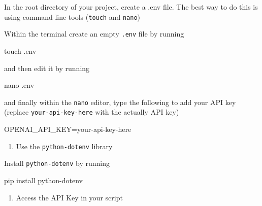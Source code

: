 \documentclass[
  letterpaper,
  DIV=11,
  numbers=noendperiod]{scrreprt}
\newenvironment{Shaded}{\begin{snugshade}}{\end{snugshade}}
\newcommand{\NormalTok}[1]{\textcolor[rgb]{0.00,0.23,0.31}{#1}}
\newcommand{\OperatorTok}[1]{\textcolor[rgb]{0.37,0.37,0.37}{#1}}
\newcommand{\OtherTok}[1]{\textcolor[rgb]{0.00,0.23,0.31}{#1}}
\newcommand{\SpecialCharTok}[1]{\textcolor[rgb]{0.37,0.37,0.37}{#1}}
\providecommand{\tightlist}{%
  \setlength{\itemsep}{0pt}\setlength{\parskip}{0pt}}\usepackage{longtable,booktabs,array}
\begin{document}
\begin{tcolorbox}
In the root directory of your project, create a .env file. The best way
to do this is using command line tools (\texttt{touch} and
\texttt{nano})

Within the terminal create an empty \texttt{.env} file by running

\begin{Shaded}
\begin{Highlighting}[]
\NormalTok{touch .env}
\end{Highlighting}
\end{Shaded}

and then edit it by running

\begin{Shaded}
\begin{Highlighting}[]
\NormalTok{nano .env}
\end{Highlighting}
\end{Shaded}

and finally within the \texttt{nano} editor, type the following to add
your API key (replace \texttt{your-api-key-here} with the actually API
key)

\begin{Shaded}
\begin{Highlighting}[]
\NormalTok{OPENAI\_API\_KEY}\OtherTok{=}\NormalTok{your}\SpecialCharTok{{-}}\NormalTok{api}\SpecialCharTok{{-}}\NormalTok{key}\SpecialCharTok{{-}}\NormalTok{here}
\end{Highlighting}
\end{Shaded}

\begin{enumerate}
\def\labelenumi{\arabic{enumi}.}
\setcounter{enumi}{1}
\tightlist
\item
  Use the \texttt{python-dotenv} library
\end{enumerate}

Install \texttt{python-dotenv} by running

\begin{Shaded}
\begin{Highlighting}[]
\NormalTok{pip install python}\OperatorTok{{-}}\NormalTok{dotenv}
\end{Highlighting}
\end{Shaded}

\begin{enumerate}
\def\labelenumi{\arabic{enumi}.}
\setcounter{enumi}{2}
\tightlist
\item
  Access the API Key in your script
\end{enumerate}


\end{tcolorbox}
\end{document}
